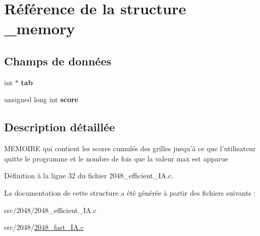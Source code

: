 \hypertarget{struct__memory}{
\section{Référence de la structure \_\-memory}
\label{struct__memory}
}
\subsection*{Champs de données}
\begin{DoxyCompactItemize}
\item 
\hypertarget{struct__memory_a269728afc56c8f66199335397f403bc8}{
int $\ast$ {\bfseries tab}}
\label{struct__memory_a269728afc56c8f66199335397f403bc8}

\item 
\hypertarget{struct__memory_afa23aef9d235eb9bd53c89f1a5179645}{
unsigned long int {\bfseries score}}
\label{struct__memory_afa23aef9d235eb9bd53c89f1a5179645}

\end{DoxyCompactItemize}


\subsection{Description détaillée}
MEMOIRE qui contient les scores cumulés des grilles jusqu'à ce que l'utilisateur quitte le programme et le nombre de fois que la valeur max est apparue 

Définition à la ligne 32 du fichier 2048\_\-efficient\_\-IA.c.



La documentation de cette structure a été générée à partir des fichiers suivants :\begin{DoxyCompactItemize}
\item 
src/2048/2048\_\-efficient\_\-IA.c\item 
src/2048/\hyperlink{2048__fast___i_a_8c}{2048\_\-fast\_\-IA.c}\end{DoxyCompactItemize}
